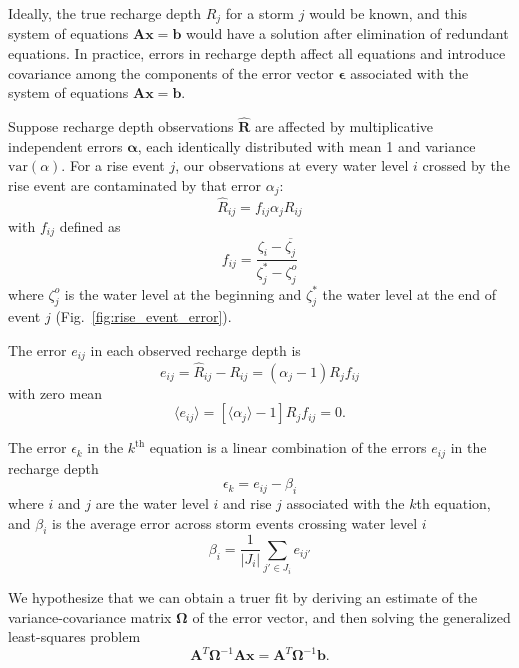 \documentclass[11pt,a4paper]{article}
\renewcommand{\vec}[1]{\mathbf{#1}}
\begin{document}
Ideally, the true recharge depth $R_j$ for a storm $j$ would be known,
and this system of equations $\vec{A}\vec{x} = \vec{b}$ would have a
solution after elimination of redundant equations.  In practice,
errors in recharge depth affect all equations and introduce covariance
among the components of the error vector $\bm{\epsilon}$ associated
with the system of equations $\vec{A}\vec{x} = \vec{b}$.

Suppose recharge depth observations $\widehat{\mathbf{R}}$ are
affected by multiplicative independent errors $\bm{\alpha}$, each
identically distributed with mean 1 and variance $\text{var}(\alpha)$.
For a rise event $j$, our observations at every water level $i$
crossed by the rise event are contaminated by that error $\alpha_j$:
\begin{equation}
  \widehat{R}_{ij} = f_{ij}\alpha_j R_{ij}
\end{equation}
with $f_{ij}$ defined as
\begin{equation}
f_{ij} = \frac{\zeta_i - \overline{\zeta_j}}{\zeta_j^* - \zeta^o_j}
\end{equation}
where $\zeta^o_j$ is the water level at the beginning and $\zeta^*_j$
the water level at the end of event $j$
(Fig.~\ref{fig:rise_event_error}).

The error $e_{ij}$ in each observed recharge depth is
\begin{equation}
  \label{eq:recharge_error_mean}
  e_{ij} = \widehat{R}_{ij} - R_{ij} = (\alpha_j - 1) R_j f_{ij}
\end{equation}
with zero mean
\begin{equation}
  \langle e_{ij} \rangle = \left[\langle \alpha_j\rangle - 1\right] R_j f_{ij} = 0.
\end{equation}

The error $\epsilon_k$ in the $k^\text{th}$ equation is a linear
combination of the errors $e_{ij}$ in the recharge depth
\begin{equation}
  \label{eq:epsilon_k}
  \epsilon_k = e_{ij} - \beta_i
\end{equation}
where $i$ and $j$ are the water level $i$ and rise $j$ associated with
the $k$th equation, and $\beta_i$ is the average error across storm
events crossing water level $i$
\begin{equation}
  \label{eq:beta_i}
  \beta_i = \frac{1}{|J_i|}\sum_{j' \in J_i} e_{ij'}
\end{equation}

We hypothesize that we can obtain a truer fit by deriving an estimate
of the variance-covariance matrix $\bm{\Omega}$ of the error vector,
and then solving the generalized least-squares problem
\begin{equation}
  \label{eq:generalized_lsq}
  \vec{A}^T \bm{\Omega}^{-1} \vec{A} \vec{x} = \vec{A}^T \bm{\Omega}^{-1} \vec{b}.
\end{equation}
\end{document}
